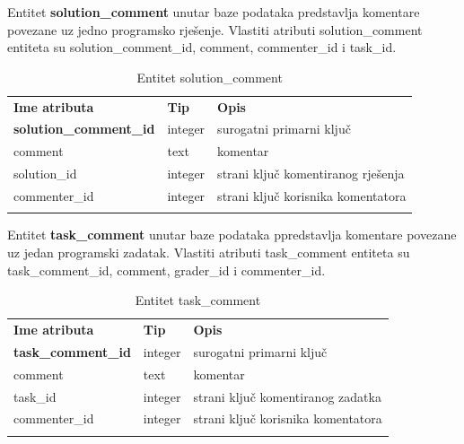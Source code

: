 \documentclass[times, utf8, zavrsni, numeric]{fer}
\begin{document}
		Entitet \textbf{solution\_comment} unutar baze podataka predstavlja komentare povezane uz jedno programsko rješenje. Vlastiti atributi solution\_comment entiteta su solution\_comment\_id, comment, commenter\_id i task\_id. 
		\begin{table}[H]
			\caption{Entitet solution\_comment}
			\label{tbl:solutioncomment}
			\centering
			\begin{tabu} to \textwidth {XXX}
				\tabucline[1.75pt]{-}
				\textbf{Ime atributa} & \textbf{Tip} & \textbf{Opis}\\ 				
				\tabucline[1.75pt]{-}
				\textbf{solution\_comment\_id} & integer & surogatni primarni ključ\\ \hline
				comment & text & komentar\\ \hline
				solution\_id & integer & strani ključ komentiranog rješenja\\ \hline
				commenter\_id & integer & strani ključ korisnika komentatora\\ \hline
				\tabucline[1.75pt]{-}
			\end{tabu}
		\end{table}
	
		Entitet \textbf{task\_comment} unutar baze podataka ppredstavlja komentare povezane uz jedan programski zadatak. Vlastiti atributi task\_comment entiteta su task\_comment\_id, comment, grader\_id i commenter\_id. 
		\begin{table}[H]
			\caption{Entitet task\_comment}
			\label{tbl:taskcomment}
			\centering
			\begin{tabu} to \textwidth {XXX}
				\tabucline[1.75pt]{-}
				\textbf{Ime atributa} & \textbf{Tip} & \textbf{Opis}\\ 				
				\tabucline[1.75pt]{-}
				\textbf{task\_comment\_id} & integer & surogatni primarni ključ\\ \hline
				comment & text & komentar\\ \hline
				task\_id & integer & strani ključ komentiranog zadatka\\ \hline
				commenter\_id & integer & strani ključ korisnika komentatora\\ \hline
				\tabucline[1.75pt]{-}
			\end{tabu}
		\end{table}
	
\end{document}
